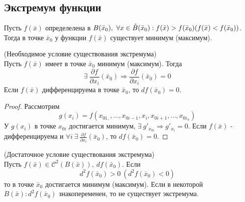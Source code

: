 \subsection{Экстремум функции}
\begin{definition}
    Пусть $f(\bar{x})$ определелена в $B(\bar{x}_0),\ \forall x\in \mathring{B}(\bar{x}_0): f(\bar{x})>f(\bar{x}_0)\\ (f(\bar{x})<f(\bar{x}_0))$. Тогда в точке $\bar{x}_0$ у функции $f(\bar{x})$ существует минимум (максимум).
\end{definition} 
\begin{theorem} (Необходимое условие существования экстремума)\\
    Пусть $f(\bar{x})$ имеет в точке $\bar{x}_0$ минимум (максимум). Тогда
    \[\exists\ \frac{\partial {f}}{\partial {x_i}}(\bar{x}_0) \Rightarrow \frac{\partial {f}}{\partial {x_i}}(\bar{x}_0)=0\]
    Если $f(\bar{x})$ дифференцируема в точке $\bar{x}_0$, то $df(\bar{x}_0)=0$. 
\end{theorem} 
\begin{proof}
    Рассмотрим \
    \[g(x_i)=f(x_{01,},\dots,x_{0i-1},x_i,x_{0i+1},\dots,x_{0i_n})\]
    У $g(x_i)$ в точке $x_{0i}$ достигается минимум, $\exists\ g'_{x_{0i}} \Rightarrow g'_{x_i}=0$. Если $f(\bar{x})$ - дифференцируема и $\forall i\ \exists\ \frac{\partial {f}}{\partial {x_i}}(\bar{x}_0)$, то $df(\bar{x}_0)=0$.
\end{proof} 
\begin{theorem} (Достаточное условие существования экстремума)\\
    Пусть $f(\bar{x})\in \mathcal{C}^2(B(\bar{x})),\ df(\bar{x}_0)$. Если 
    \[d^2f(\bar{x}_0)>0\ (d^2f(\bar{x}_0)<0)\] 
    то в точке $\bar{x}_0$ достигается минимум (максимум). Если в некоторой $B(\bar{x}): d^2f(\bar{x}_0)$ знакопеременен, то не существует экстремума.
\end{theorem} 
